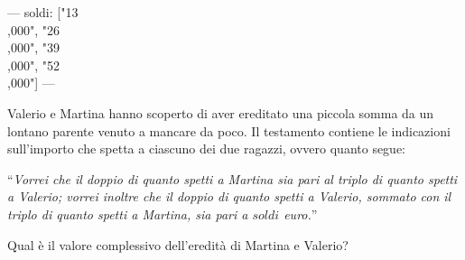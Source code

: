 ---
soldi: ["13\\,000", "26\\,000", "39\\,000", "52\\,000"]
---

\begin{esercizio}{1}
Valerio e Martina hanno scoperto di aver ereditato una piccola somma da un lontano parente venuto a mancare da poco.
Il testamento contiene le indicazioni sull’importo che spetta a ciascuno dei due ragazzi, ovvero quanto segue:

``\emph{Vorrei che il doppio di quanto spetti a Martina sia pari al triplo di quanto spetti a Valerio;
vorrei inoltre che il doppio di quanto spetti a Valerio, sommato con il triplo di quanto spetti a Martina,
sia pari a ${soldi}$ euro.}''

Qual è il valore complessivo dell'eredità di Martina e Valerio?

\end{esercizio}
